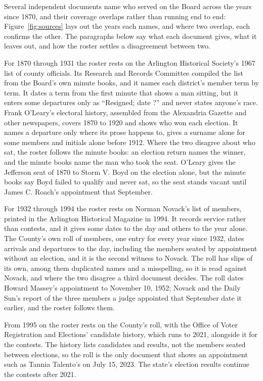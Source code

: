Several independent documents name who served on the Board across the years
since 1870, and their coverage overlaps rather than running end to end:
Figure~\ref{fig:sources} lays out the years each names, and where two
overlap, each confirms the other. The paragraphs below say what each
document gives, what it leaves out, and how the roster settles a disagreement
between two.

For 1870 through 1931 the roster rests on the Arlington Historical Society's 1967 list of county
officials. Its Research and Records Committee compiled the list from the Board's
own minute books, and it names each district's member term by
term.\autocite{arlhist1967officials} It dates a term from the first minute that
shows a man sitting, but it enters some departures only as ``Resigned; date ?''
and never states anyone's race. Frank O'Leary's electoral history, assembled from
the Alexandria Gazette and other newspapers, covers 1870 to 1920 and shows who won
each election.\autocite{oleary2010} It names a departure only where its prose
happens to, gives a surname alone for some members and initials alone before 1912.
Where the two disagree about who sat, the roster follows the minute books: an election return
names the winner, and the minute books name the man who took the seat. O'Leary
gives the Jefferson seat of 1870 to Storm V. Boyd on the election alone, but the
minute books say Boyd failed to qualify and never sat, so the seat stands vacant
until James C. Roach's appointment that September.

For 1932 through 1994 the roster rests on Norman Novack's list of members, printed in the Arlington
Historical Magazine in 1994.\autocite{novack1994} It records service rather than
contests, and it gives some dates to the day and others to the year alone. The
County's own roll of members, one entry for every year since 1932, dates arrivals
and departures to the day, including the members seated by appointment without an
election, and it is the second witness to Novack.\autocite{arlingtonva2026members}
The roll has slips of its own, among them duplicated names and a misspelling, so
it is read against Novack, and where the two disagree a third document decides. The
roll dates Howard Massey's appointment to November 10, 1952; Novack and the Daily
Sun's report of the three members a judge appointed that September date it
earlier, and the roster follows them.\autocite{dailysun1952appointees}

From 1995 on the roster rests on the County's roll, with the Office of Voter Registration and
Elections' candidate history, which runs to 2021, alongside it for the
contests.\autocite{arlingtonelections2021} The history lists candidates and
results, not the members seated between elections, so the roll is the only
document that shows an appointment such as Tannia Talento's on July 15, 2023. The
state's election results continue the contests after 2021.

